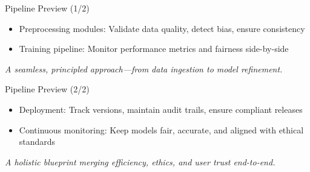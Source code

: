 \documentclass[aspectratio=169]{beamer}
\begin{document}
%
%
\begin{frame}{Pipeline Preview (1/2)}
\begin{itemize}
\item Preprocessing modules: Validate data quality, detect bias, ensure consistency
\item Training pipeline: Monitor performance metrics and fairness side-by-side
\end{itemize}

\vspace{0.8em}
\emph{A seamless, principled approach—from data ingestion to model refinement.}
\end{frame}

%
%
\begin{frame}{Pipeline Preview (2/2)}
\begin{itemize}
\item Deployment: Track versions, maintain audit trails, ensure compliant releases
\item Continuous monitoring: Keep models fair, accurate, and aligned with ethical standards
\end{itemize}

\vspace{0.8em}
\emph{A holistic blueprint merging efficiency, ethics, and user trust end-to-end.}

\end{frame}
\end{document}
